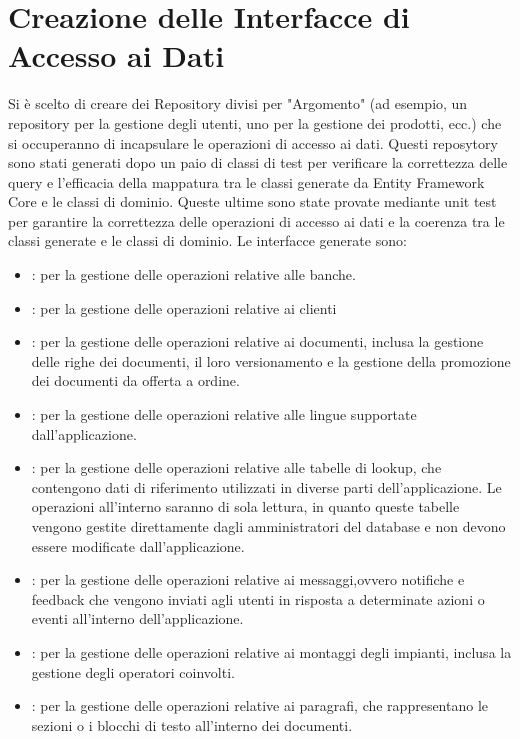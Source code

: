\documentclass[12pt, a4paper]{article}
\begin{document}
\section{Creazione delle Interfacce di Accesso ai Dati}
Si è scelto di creare dei Repository divisi per "Argomento" (ad esempio, un repository per la gestione degli utenti, uno per la gestione dei prodotti, ecc.)
che si occuperanno di incapsulare le operazioni di accesso ai dati.
Questi reposytory sono stati generati dopo un paio di classi di test per verificare la correttezza delle query e
l'efficacia della mappatura tra le classi generate da Entity Framework Core e le classi di dominio. Queste ultime sono state provate mediante unit test
per garantire la correttezza delle operazioni di accesso ai dati e la coerenza tra le classi generate e le classi di dominio.
Le interfacce generate sono:
\begin{itemize}
    \item {}: per la gestione delle operazioni relative alle banche.
    \item {}: per la gestione delle operazioni relative ai clienti
    \item {}: per la gestione delle operazioni relative ai documenti, inclusa la gestione delle righe dei documenti,
    il loro versionamento e la gestione della promozione dei documenti da offerta a ordine.
    \item {}: per la gestione delle operazioni relative alle lingue supportate dall'applicazione.
    \item {}: per la gestione delle operazioni relative alle tabelle di lookup, che contengono dati di riferimento utilizzati in diverse parti dell'applicazione.
    Le operazioni all'interno saranno di sola lettura, in quanto queste tabelle vengono gestite direttamente dagli amministratori del database e non devono essere modificate dall'applicazione.
    \item {}: per la gestione delle operazioni relative ai messaggi,ovvero notifiche e feedback che vengono inviati agli utenti in risposta a determinate azioni o eventi all'interno dell'applicazione.
    \item {}: per la gestione delle operazioni relative ai montaggi degli impianti, inclusa la gestione degli operatori coinvolti.
    \item {}: per la gestione delle operazioni relative ai paragrafi, che rappresentano le sezioni o i blocchi di testo all'interno dei documenti.

\end{itemize}
\end{document}
